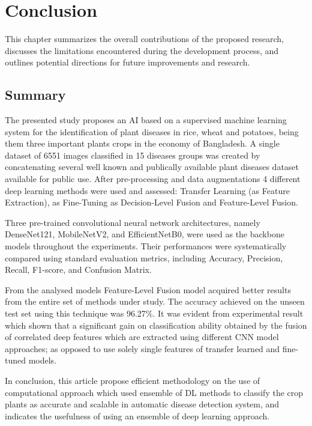 \chapter{Conclusion}

This chapter summarizes the overall contributions of the proposed research, discusses the limitations encountered during the development process, and outlines potential directions for future improvements and research.

\section{Summary}

The presented study proposes an AI based on a supervised machine learning system for the identification of plant diseases in rice, wheat and potatoes, being them three important plants crops in the economy of Bangladesh. A single dataset of 6551 images classified in 15 diseases groups was created by concatenating several well known and publically available plant diseases dataset available for public use. After pre-processing and data augmentations 4 different deep learning methods were used and assessed: Transfer Learning (as Feature Extraction), as Fine-Tuning as Decision-Level Fusion and Feature-Level Fusion.

Three pre-trained convolutional neural network architectures, namely DenseNet121, MobileNetV2, and EfficientNetB0, were used as the backbone models throughout the experiments. Their performances were systematically compared using standard evaluation metrics, including Accuracy, Precision, Recall, F1-score, and Confusion Matrix.

From the analysed models Feature-Level Fusion model acquired better results from the entire set of methods under study. The accuracy achieved on the unseen test set using this technique was 96.27\%. It was evident from experimental result which shown that a significant gain on classification ability obtained by the fusion of correlated deep features which are extracted using different CNN model approaches; as opposed to use solely single features of transfer learned and fine-tuned models.

In conclusion, this article propose efficient methodology on the use of computational approach which used ensemble of DL methods to classify the crop plants as accurate and scalable in automatic disease detection system, and indicates the usefulness of using an ensemble of deep learning approach.

